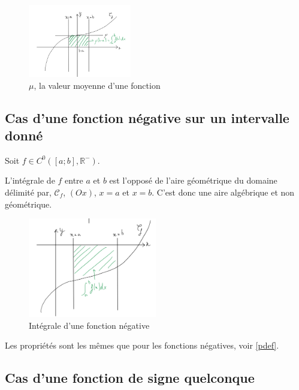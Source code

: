 \begin{figure}[!htb]
    \centering
    \includegraphics[width=0.4\textwidth]{SCHEMA-3.png}
    \caption{\(\mu\), la valeur moyenne d'une fonction }
    \label{fig:SCHEMA-3}
\end{figure}

\newpage
\subsection{Cas d'une fonction négative sur un intervalle donné}

\begin{definition}
    Soit \(f \in C^{0}([a;b], \mathbb{R}^{-})\). \par
    L'intégrale de \(f\) entre \(a\) et \(b\) est l'opposé de l'aire géométrique du domaine délimité par, \(\mathcal{C}_f\), \((Ox)\), \(x=a\) et \(x=b\). C'est donc une aire algébrique et non géométrique.    
\end{definition}
\begin{figure}[!htb]
    \centering
    \includegraphics[width=0.5\textwidth]{SCHEMA-4.png}
    \caption{Intégrale d'une fonction négative}
    \label{fig:SCHEMA-4}
\end{figure}

\begin{corollary}[Propriétés]
    Les propriétés sont les mêmes que pour les fonctions négatives, voir \autoref{pdef}. 
\end{corollary}

\subsection{Cas d'une fonction de signe quelconque}

